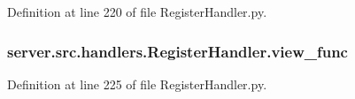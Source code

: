 Definition at line 220 of file Register\+Handler.\+py.

\subsubsection[{\texorpdfstring{view\+\_\+func}{view_func}}]{\setlength{\rightskip}{0pt plus 5cm}server.\+src.\+handlers.\+Register\+Handler.\+view\+\_\+func}\hypertarget{namespaceserver_1_1src_1_1handlers_1_1_register_handler_a6be70d95ab826685feb65087c99c514b}{}\label{namespaceserver_1_1src_1_1handlers_1_1_register_handler_a6be70d95ab826685feb65087c99c514b}


Definition at line 225 of file Register\+Handler.\+py.


